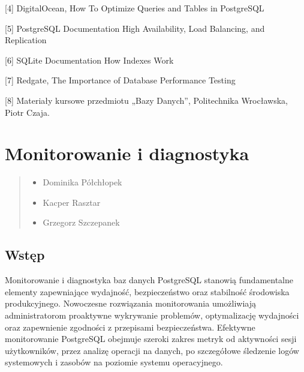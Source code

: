 \documentclass[letterpaper,10pt,polish]{sphinxmanual}
\begin{document}
\sphinxAtStartPar
{[}4{]} DigitalOcean, How To Optimize Queries and Tables in PostgreSQL

\sphinxAtStartPar
{[}5{]} PostgreSQL Documentation \textendash{} High Availability, Load Balancing, and Replication

\sphinxAtStartPar
{[}6{]} SQLite Documentation \textendash{} How Indexes Work

\sphinxAtStartPar
{[}7{]} Redgate, The Importance of Database Performance Testing

\sphinxAtStartPar
{[}8{]} Materiały kursowe przedmiotu „Bazy Danych”, Politechnika Wrocławska, Piotr Czaja.

\sphinxstepscope


\section{Monitorowanie i diagnostyka}
\label{\detokenize{rozdzial2/repo-wspolne/index:monitorowanie-i-diagnostyka}}\label{\detokenize{rozdzial2/repo-wspolne/index::doc}}\begin{quote}\begin{description}
\begin{itemize}
\item {} 
\sphinxAtStartPar
Dominika Półchłopek

\item {} 
\sphinxAtStartPar
Kacper Rasztar

\item {} 
\sphinxAtStartPar
Grzegorz Szczepanek

\end{itemize}

\end{description}\end{quote}


\subsection{Wstęp}
\label{\detokenize{rozdzial2/repo-wspolne/index:wstep}}
\sphinxAtStartPar
Monitorowanie i diagnostyka baz danych PostgreSQL stanowią fundamentalne elementy zapewniające wydajność, bezpieczeństwo oraz stabilność środowiska produkcyjnego. Nowoczesne rozwiązania monitorowania umożliwiają administratorom proaktywne wykrywanie problemów, optymalizację wydajności oraz zapewnienie zgodności z przepisami bezpieczeństwa. Efektywne monitorowanie PostgreSQL obejmuje szeroki zakres metryk \sphinxhyphen{} od aktywności sesji użytkowników, przez analizę operacji na danych, po szczegółowe śledzenie logów systemowych i zasobów na poziomie systemu operacyjnego.
\end{document}
